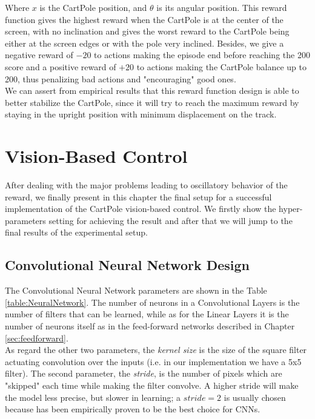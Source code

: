 Where $x$ is the CartPole position, and $\theta$ is its angular position. This reward function gives the highest reward when the CartPole is at the center of the screen, with no inclination and gives the worst reward to the CartPole being either at the screen edges or with the pole very inclined. Besides, we give a negative reward of $-20$ to actions making the episode end before reaching the 200 score and a positive reward of $+20$ to actions making the CartPole balance up to 200, thus penalizing bad actions and "encouraging" good ones.
\\
\indent We can assert from empirical results that this reward function design is able to better stabilize the CartPole, since it will try to reach the maximum reward by staying in the upright position with minimum displacement on the track. 

\section{Vision-Based Control}

After dealing with the major problems leading to oscillatory behavior of the reward, we finally present in this chapter the final setup for a successful implementation of the CartPole vision-based control. We firstly show the hyper-parameters setting for achieving the result and after that we will jump to the final results of the experimental setup.

\subsection{Convolutional Neural Network Design}

The Convolutional Neural Network parameters are shown in the Table \ref{table:NeuralNetwork}. The number of neurons in a Convolutional Layers is the number of filters that can be learned, while as for the Linear Layers it is the number of neurons itself as in the feed-forward networks described in Chapter \ref{sec:feedforward}. 
\\
\indent As regard the other two parameters, the \textit{kernel size} is the size of the square filter actuating convolution over the inputs (i.e. in our implementation we have a 5x5 filter). The second parameter, the \textit{stride}, is the number of pixels which are "skipped" each time while making the filter convolve. A higher stride will make the model less precise, but slower in learning; a $stride = 2$ is usually chosen because has been empirically proven to be the best choice for CNNs.



